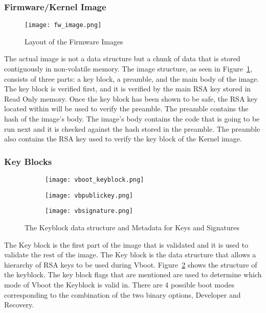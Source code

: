 \documentclass[../report.tex]{subfiles}
\begin{document}
\subsubsection{Firmware/Kernel Image}

\begin{figure}
    \centering
    \texttt{[image: fw\_image.png]}
    \caption{Layout of the Firmware Images~\cite{vboot-data-structures}}
    \label{fig:vboot_images}
\end{figure}

The actual image is not a data structure but a chunk of data that is stored contiguously in non-volatile memory.
The image structure, as seen in Figure~\ref{fig:vboot_images}, consists of three parts: a key block, a preamble, and the main body of the image.
The key block is verified first, and it is verified by the main RSA key stored in Read Only memory.
Once the key block has been shown to be safe, the RSA key located within will be used to verify the preamble.
The preamble contains the hash of the image's body.
The image's body contains the code that is going to be run next and it is checked against the hash stored in the preamble.
The preamble also contains the RSA key used to verify the key block of the Kernel image.

\subsubsection{Key Blocks}\label{sec:key_block}

\begin{figure}
\begin{subfigure}{.5\textwidth}
  \centering
  \texttt{[image: vboot\_keyblock.png]}
\end{subfigure}
\begin{subfigure}{.20\textwidth}
  \centering
  \texttt{[image: vbpublickey.png]}
\end{subfigure}
\begin{subfigure}{.20\textwidth}
  \centering
  \texttt{[image: vbsignature.png]}
\end{subfigure}
\caption{The Keyblock data structure and Metadata for Keys and Signatures}
\label{fig:vboot_keyblock}
\end{figure}

The Key block is the first part of the image that is validated and it is used to validate the rest of the image.
The Key block is the data structure that allows a hierarchy of RSA keys to be used during Vboot.
Figure~\ref{fig:vboot_keyblock} shows the structure of the keyblock. 
The key block flags that are mentioned are used to determine which mode of Vboot the Keyblock is valid in. 
There are 4 possible boot modes corresponding to the combination of the two binary options, Developer and Recovery.
\end{document}
